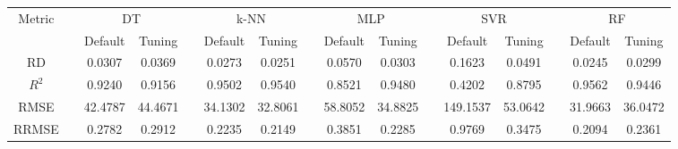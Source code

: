 \begin{table}[!htbp]
	\setlength{\tabcolsep}{3pt}
	\begin{tabular}{cccccccccccccccc}
		\toprule
		\multirow{2}{*}{Metric} & & \multicolumn{2}{c}{DT} & & \multicolumn{2}{c}{k-NN} & & \multicolumn{2}{c}{MLP} & & \multicolumn{2}{c}{SVR} & & \multicolumn{2}{c}{RF}\\
		 \cline{3-4} \cline{6-7} \cline{9-10} \cline{12-13} \cline{15-16}
		  & & Default & Tuning & & Default & Tuning & & Default & Tuning & & Default & Tuning & & Default & Tuning\\
		\midrule
		RD & & 0.0307 & 0.0369 & & 0.0273 & 0.0251 & & 0.0570 & 0.0303 & & 0.1623 & 0.0491 & & 0.0245 & 0.0299\\
		$R^2$ & & 0.9240 & 0.9156 & & 0.9502 & 0.9540 & & 0.8521 & 0.9480 & & 0.4202 & 0.8795 & & 0.9562 & 0.9446\\
		RMSE & & 42.4787 & 44.4671 & & 34.1302 & 32.8061 & & 58.8052 & 34.8825 & & 149.1537 & 53.0642 & & 31.9663 & 36.0472\\
		RRMSE & & 0.2782 & 0.2912 & & 0.2235 & 0.2149 & & 0.3851 & 0.2285 & & 0.9769 & 0.3475 & & 0.2094 & 0.2361\\
		\bottomrule
	\end{tabular}
\end{table}
